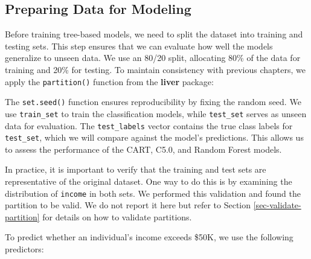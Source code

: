 \documentclass[
  11pt,
]{book}
\makeatletter
\newenvironment{Shaded}{}{}
\newcommand{\AttributeTok}[1]{#1}
\newcommand{\DecValTok}[1]{#1}
\newcommand{\FloatTok}[1]{#1}
\newcommand{\FunctionTok}[1]{#1}
\newcommand{\NormalTok}[1]{#1}
\newcommand{\OtherTok}[1]{\textcolor[rgb]{0.39,0.39,0.39}{#1}}
\newcommand{\SpecialCharTok}[1]{\textcolor[rgb]{0.39,0.39,0.39}{#1}}
\newenvironment{kframe}{%
\medskip{}
\setlength{\fboxsep}{.8em}
 \def\at@end@of@kframe{}%
 \ifinner\ifhmode%
  \def\at@end@of@kframe{\end{minipage}}%
  \begin{minipage}{\columnwidth}%
 \fi\fi%
 \def\FrameCommand##1{\hskip\@totalleftmargin \hskip-\fboxsep
 \colorbox{shadecolor}{##1}\hskip-\fboxsep
     \hskip-\linewidth \hskip-\@totalleftmargin \hskip\columnwidth}%
 \MakeFramed {\advance\hsize-\width
   \@totalleftmargin\z@ \linewidth\hsize
   \@setminipage}}%
 {\par\unskip\endMakeFramed%
 \at@end@of@kframe}
\renewenvironment{Shaded}{\begin{kframe}}{\end{kframe}}
\theoremstyle{definition}
\theoremstyle{definition}
\theoremstyle{definition}
\theoremstyle{definition}
\theoremstyle{remark}
\makeatother
\begin{document}
\subsection*{Preparing Data for Modeling}\label{preparing-data-for-modeling-2}


Before training tree-based models, we need to split the dataset into training and testing sets. This step ensures that we can evaluate how well the models generalize to unseen data. We use an 80/20 split, allocating 80\% of the data for training and 20\% for testing. To maintain consistency with previous chapters, we apply the \texttt{partition()} function from the \textbf{liver} package:

\begin{Shaded}
\end{Shaded}

The \texttt{set.seed()} function ensures reproducibility by fixing the random seed. We use \texttt{train\_set} to train the classification models, while \texttt{test\_set} serves as unseen data for evaluation. The \texttt{test\_labels} vector contains the true class labels for \texttt{test\_set}, which we will compare against the model's predictions. This allows us to assess the performance of the CART, C5.0, and Random Forest models.

In practice, it is important to verify that the training and test sets are representative of the original dataset. One way to do this is by examining the distribution of \texttt{income} in both sets. We performed this validation and found the partition to be valid. We do not report it here but refer to Section \ref{sec-validate-partition} for details on how to validate partitions.

To predict whether an individual's income exceeds \$50K, we use the following predictors:
\end{document}

